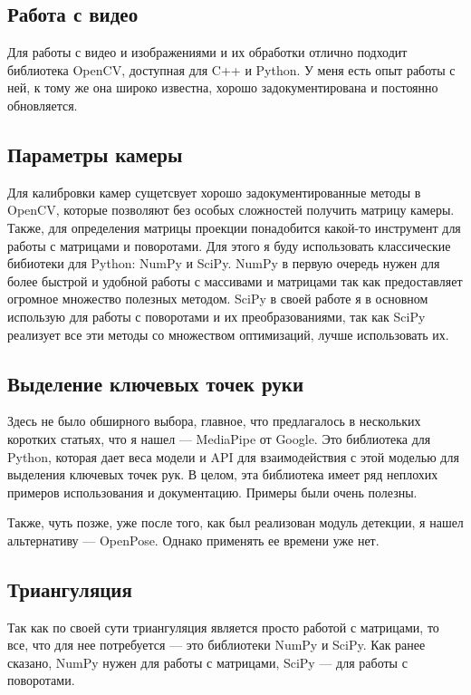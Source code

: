 \documentclass[12pt, a4paper]{article}
\begin{document}
\subsection{Работа с видео}
Для работы с видео и изображениями и их обработки отлично подходит библиотека
OpenCV, доступная для C++ и Python. У меня есть опыт работы с ней, к тому же она
широко известна, хорошо задокументирована и постоянно обновляется.

\subsection{Параметры камеры}
Для калибровки камер сущетсвует хорошо
задокументированные\cite{opencv_calibration_tutorial, opencv_charuco_pose}
методы в OpenCV, которые позволяют без особых сложностей получить матрицу
камеры. Также, для определения матрицы проекции понадобится какой-то инструмент
для работы с матрицами и поворотами. Для этого я буду использовать классические
бибиотеки для Python: NumPy и SciPy. NumPy в первую очередь нужен для более
быстрой и удобной работы с массивами и матрицами так как предоставляет огромное
множество полезных методом. SciPy в своей работе я в основном использую для
работы с поворотами и их преобразованиями, так как SciPy реализует все эти
методы со множеством оптимизаций, лучше использовать их.

\subsection{Выделение ключевых точек руки}
Здесь не было обширного выбора, главное, что предлагалось в нескольких коротких
статьях, что я нашел --- MediaPipe от Google. Это библиотека для Python, которая
дает веса модели и API для взаимодействия с этой моделью для выделения ключевых
точек рук. В целом, эта библиотека имеет ряд неплохих примеров использования и
документацию. Примеры были очень полезны.
\par
Также, чуть позже, уже после того, как был реализован модуль детекции, я нашел альтернативу --- OpenPose. Однако применять ее времени уже нет.

\subsection{Триангуляция}
Так как по своей сути триангуляция является просто работой с матрицами, то все, что для нее потребуется --- это библиотеки NumPy и SciPy. Как ранее сказано, NumPy нужен для работы с матрицами, SciPy --- для работы с поворотами.
\end{document}
